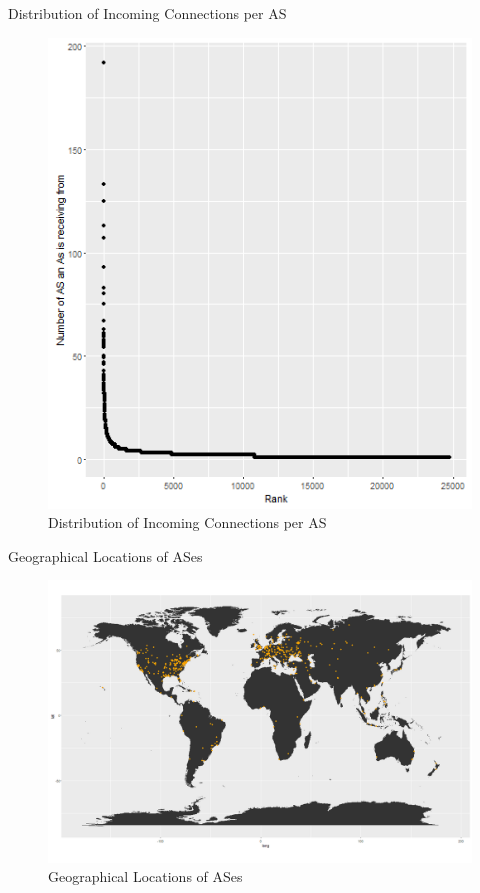 \documentclass[conference, 11pt]{IEEEtran}
\begin{document}
\begin{appendices}

\begin{section}{Distribution of Incoming Connections per AS}
\begin{figure}[htbp]
\centerline{\includegraphics[scale=0.4]{Graphics/AsToDistribution.png}}
\caption{Distribution of Incoming Connections per AS}
\label{fig}
\end{figure}
\end{section}

\vspace{1cm}

\begin{section}{Geographical Locations of ASes}
\begin{figure}[htbp]
\centerline{\includegraphics[scale=0.2]{Graphics/ASesNurPunkte.png}}
\caption{Geographical Locations of ASes}
\label{fig}
\end{figure}
\end{section}
\vspace{3.5cm}



\end{appendices}
\end{document}
